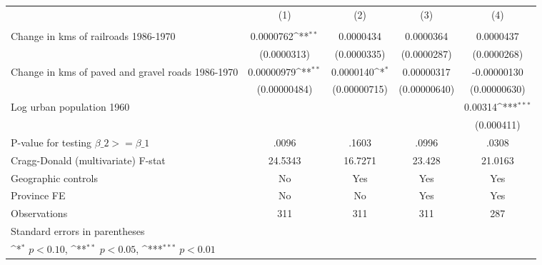 {
\def\sym#1{\ifmmode^{#1}\else\(^{#1}\)\fi}
\begin{tabular}{l*{4}{c}}
\hline\hline
                &\multicolumn{1}{c}{(1)}&\multicolumn{1}{c}{(2)}&\multicolumn{1}{c}{(3)}&\multicolumn{1}{c}{(4)}\\
                &\multicolumn{1}{c}{}&\multicolumn{1}{c}{}&\multicolumn{1}{c}{}&\multicolumn{1}{c}{}\\
\hline
Change in kms of railroads 1986-1970&0.0000762\sym{**} &0.0000434         &0.0000364         &0.0000437         \\
                &(0.0000313)         &(0.0000335)         &(0.0000287)         &(0.0000268)         \\
[1em]
Change in kms of paved and gravel roads 1986-1970&0.00000979\sym{**} &0.0000140\sym{*}  &0.00000317         &-0.00000130         \\
                &(0.00000484)         &(0.00000715)         &(0.00000640)         &(0.00000630)         \\
[1em]
Log urban population 1960&                  &                  &                  &  0.00314\sym{***}\\
                &                  &                  &                  &(0.000411)         \\
\hline
P-value for testing $\beta\_{2} >= \beta\_{1}$&    .0096         &    .1603         &    .0996         &    .0308         \\
Cragg-Donald (multivariate) F-stat&  24.5343         &  16.7271         &   23.428         &  21.0163         \\
Geographic controls&       No         &      Yes         &      Yes         &      Yes         \\
Province FE     &       No         &       No         &      Yes         &      Yes         \\
Observations    &      311         &      311         &      311         &      287         \\
\hline\hline
\multicolumn{5}{l}{\footnotesize Standard errors in parentheses}\\
\multicolumn{5}{l}{\footnotesize \sym{*} \(p<0.10\), \sym{**} \(p<0.05\), \sym{***} \(p<0.01\)}\\
\end{tabular}
}
